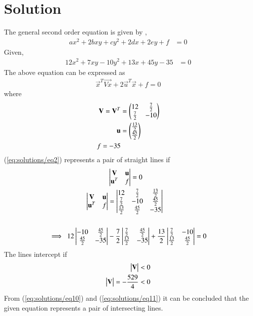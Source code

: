 \documentclass[journal,12pt,twocolumn]{IEEEtran}
\begin{document}
\section{Solution}
The general second order equation is given by ,
\begin{align}
ax^2+2bxy+cy^2+2dx+2ey+f&=0\label{eq1}
\end{align}
Given,
\begin{align}
    12x^2+7xy-10y^2+13x+45y-35&=0 \label{eqgiven}
\end{align}
The above equation can be expressed as
\begin{align}
        \vec{x}^{T}\vec{Vx} + 2\vec{u}^{T}\vec{x} + f=0   \label{eq:solutions/eq2}
\end{align}
where
\begin{align}
	\mathbf{V}=\mathbf{V}^T &= \begin{pmatrix}12 & \frac{7}{2} \\ \frac{7}{2} & -10\end{pmatrix} \\
	\mathbf{u} &= \begin{pmatrix}\frac{13}{2} \\ \frac{45}{2}\end{pmatrix} \\
	 f=-35
\end{align}	
	(\ref{eq:solutions/eq2}) represents a pair of straight lines if
\begin{align}
	&\begin{vmatrix}\mathbf{V} & \mathbf{u} \\ \mathbf{u}^T & f\end{vmatrix} = 0     \label{eq:solutions/eq5} \\
	\begin{vmatrix}\mathbf{V} & \mathbf{u} \\ \mathbf{u}^T & f\end{vmatrix} 
		&= \begin{vmatrix}12 & \frac{7}{2}  & \frac{13}{2} \\ 
	        \frac{7}{2} & -10 & \frac{45}{2}     \\
	       \frac{13}{2} & \frac{45}{2} & -35 \end{vmatrix}  \\
	       		\nonumber \\
	\implies \ 12\begin{vmatrix}-10 & \frac{45}{2} \\ \frac{45}{2} & -35\end{vmatrix} 
		& -\frac{7}{2}\begin{vmatrix}\frac{7}{2} & \frac{45}{2} \\ \frac{13}{2} & -35\end{vmatrix} 
		+\frac{13}{2}\begin{vmatrix}\frac{7}{2} & -10 \\ \frac{13}{2} & \frac{45}{2}\end{vmatrix} = 0 \label{eq:solutions/eq10}
\end{align}
The lines intercept if
\begin{align}
        \begin{vmatrix}\mathbf{V}\end{vmatrix} < 0 \\
 	\begin{vmatrix}\mathbf{V}\end{vmatrix}=-\frac{529}{4} < 0 \label{eq:solutions/eq11}
\end{align}
\renewcommand{\thefigure}{1}
From (\ref{eq:solutions/eq10}) and (\ref{eq:solutions/eq11}) it can be concluded that the given equation represents a pair of intersecting lines.\\
\end{document}
